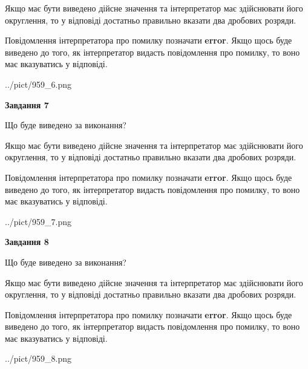 \documentclass[12pt, ukrainian]{article}
\begin{document}
{\begin {Large}
Якщо має бути виведено дійсне значення та інтерпретатор має здійснювати його округлення, 
то у відповіді достатньо правильно вказати два дробових розряди.

Повідомлення інтерпретатора про помилку позначати \textbf{error}.
Якщо щось буде виведено до того, як інтерпретатор видасть повідомлення про помилку, 
то воно має вказуватись у відповіді. \par

\begin{center}
	{../pict/959_6.png}
\end{center}
\newpage

{\begin {center}\textbf{Завдання 7}\end {center}}\par
Що буде виведено за виконання? \par

Якщо має бути виведено дійсне значення та інтерпретатор має здійснювати його округлення, 
то у відповіді достатньо правильно вказати два дробових розряди.

Повідомлення інтерпретатора про помилку позначати \textbf{error}.
Якщо щось буде виведено до того, як інтерпретатор видасть повідомлення про помилку, 
то воно має вказуватись у відповіді. \par

\begin{center}
	{../pict/959_7.png}
\end{center}
\newpage

{\begin {center}\textbf{Завдання 8}\end {center}}\par
Що буде виведено за виконання? \par

Якщо має бути виведено дійсне значення та інтерпретатор має здійснювати його округлення, 
то у відповіді достатньо правильно вказати два дробових розряди.

Повідомлення інтерпретатора про помилку позначати \textbf{error}.
Якщо щось буде виведено до того, як інтерпретатор видасть повідомлення про помилку, 
то воно має вказуватись у відповіді. \par

\begin{center}
	{../pict/959_8.png}
\end{center}
\newpage


\end{Large}}
\end{document}
